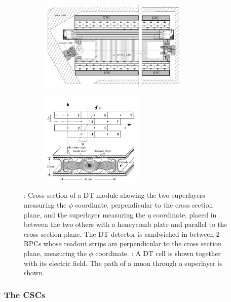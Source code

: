 	\begin{figure}[H]
		\begin{subfigure}{0.6\linewidth}
			\centering
			\includegraphics[height = 4.5cm]{fig/chapt2/DT_layout.png}
			\caption{\label{fig:DT:A}}
		\end{subfigure}
		\begin{subfigure}{0.4\linewidth}
			\centering
			\includegraphics[height = 4.5cm]{fig/chapt2/DT_cells.png}
			\caption{\label{fig:DT:B}}
		\end{subfigure}
		\caption{\label{fig:DT} : Cross section of a DT module showing the two superlayers measuring the $\phi$ coordinate, perpendicular to the cross section plane, and the superlayer measuring the $\eta$ coordinate, placed in between the two others with a honeycomb plate and parallel to the cross section plane. The DT detector is sandwiched in between 2 RPCs whose readout strips are perpendicular to the cross section plane, measuring the $\phi$ coordinate. : A DT cell is shown together with its electric field. The path of a muon through a superlayer is shown.}
	\end{figure}
	
	\newpage
	
		\subsubsection{The \acl{CSC}s}
		\label{chapt4:sssec:CSCs}
	
